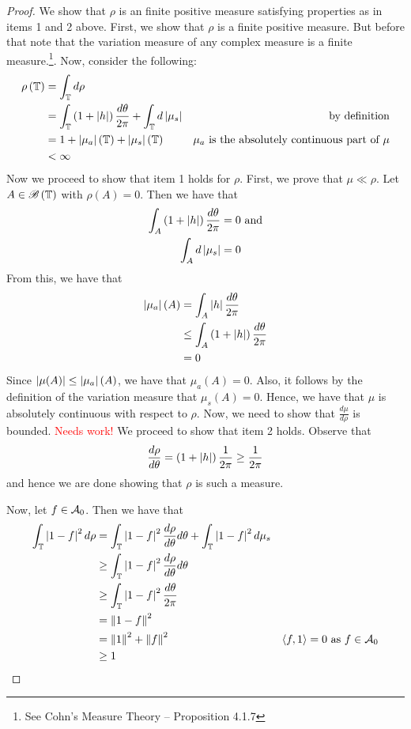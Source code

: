 \begin{proof}
   We show that $\rho$ is an finite positive measure satisfying properties as in items 1 and 2 above. First, we show that $\rho$ is a finite positive measure. But before that note that the variation measure of any complex measure is  a finite measure.\footnote{See Cohn's Measure Theory -- Proposition 4.1.7}. Now, consider the following:
   \begin{align*}
       \rho\left( \mathbb T \right) &= \int_{\mathbb T} d\rho \\
       &= \int_{\mathbb T} \left( 1+ \left\lvert h \right\rvert \right) \frac{d\theta}{2\pi} + \int_{\mathbb T} d\left\lvert \mu_{s} \right\rvert  & \text{by definition} \\
       &= 1 + \left\lvert \mu_{a} \right\rvert \left( \mathbb T \right) + \left\lvert \mu_{s} \right\rvert \left( \mathbb T \right) & \mu_{a} \text{ is the absolutely continuous part of } \mu \\
       &< \infty
   \end{align*}
   Now we proceed to show that item 1 holds for $\rho$. First, we prove that $\mu \ll \rho$. Let $A \in {\mathscr B} \left( \mathbb T \right)$ with $\rho \left( A \right) = 0$. Then we have that
   \begin{align*}
       \int_{A} \left( 1+ \left\lvert h \right\rvert \right) \frac{d\theta}{2\pi} &=0 \text{ and} \\
       \int_{A} d\left\lvert \mu_{s} \right\rvert &= 0
   \end{align*}
   From this, we have that
   \begin{align*}
       \left\lvert \mu_{a} \right\rvert \left( A \right) &=  \int_{A} \left\lvert h \right\rvert \frac{d\theta}{2\pi} \\
       &\le \int_{A} \left( 1+\left\lvert h \right\rvert  \right)\frac{d\theta}{2\pi} \\
       &= 0
   \end{align*}
   Since $\left\lvert \mu (A) \right\rvert \le \left\lvert \mu_{a} \right\rvert (A)$, we have that $\mu_{a} \left( A \right) = 0$. Also, it follows by the definition of the variation measure that $\mu_s \left( A \right) = 0$. Hence, we have that $\mu $ is absolutely continuous with respect to $\rho$. Now, we need to show that $\frac{d\mu}{d\rho}$ is bounded. \textcolor{red}{Needs work!}
We proceed to show that item 2 holds. Observe that
\begin{align*}
    \frac{d\rho}{d\theta} = \left( 1+\left\lvert h \right\rvert \right) \frac{1}{2\pi} \ge \frac{1}{2\pi}
\end{align*}
and hence we are done showing that $\rho$ is such a measure.

Now, let $f\in {\cal A}_{0}$. Then we have that
\begin{align*}
    \int_{\mathbb T} \left\lvert 1-f \right\rvert^{2} d\rho &= \int_{\mathbb T} \left\lvert 1-f \right\rvert^{2} \frac{d\rho}{d\theta} d\theta + \int_{\mathbb T} \left\lvert 1-f \right\rvert^2 d\mu_{s} \\
    &\ge \int_{\mathbb T} \left\lvert 1-f \right\rvert^{2} \frac{d\rho}{d\theta} d\theta \\
    & \ge \int_{\mathbb T} \left\lvert 1-f \right\rvert^{2} \frac{d\theta}{2\pi} \\ 
    &= \left\lVert 1-f \right\rVert^{2} \\
    &= \left\lVert 1 \right\rVert^{2} + \left\lVert f \right\rVert^{2} & \left\langle f,1 \right\rangle = 0  \text{ as } f\in {\cal A}_{0} \\
&\ge 1 
\end{align*}


\end{proof}
